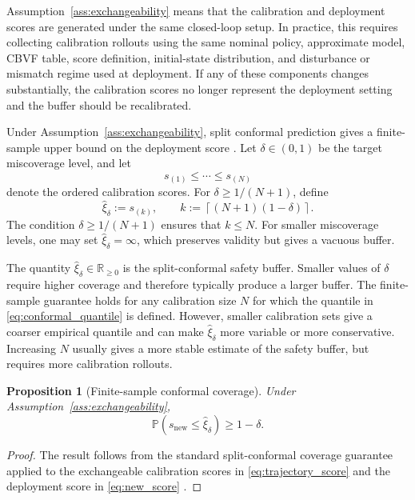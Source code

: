 \documentclass[letterpaper,10pt,conference]{ieeeconf}
\newtheorem{proposition}{Proposition}
\newcommand{\R}{\mathbb{R}}
\newcommand{\PP}{\mathbb{P}}
\begin{document}
Assumption~\ref{ass:exchangeability} means that the calibration and deployment
scores are generated under the same closed-loop setup. In practice, this
requires collecting calibration rollouts using the same nominal policy,
approximate model, CBVF table, score definition, initial-state distribution,
and disturbance or mismatch regime used at deployment. If any of these
components changes substantially, the calibration scores no longer represent
the deployment setting and the buffer should be recalibrated.

Under Assumption~\ref{ass:exchangeability}, split conformal prediction gives a
finite-sample upper bound on the deployment score
\cite{angelopoulos2023conformal,shafer2008tutorial}. Let $\delta\in(0,1)$ be
the target miscoverage level, and let
\[
    s_{(1)}\le \cdots \le s_{(N)}
\]
denote the ordered calibration scores. For $\delta\ge 1/(N+1)$, define
\begin{equation}
    \widehat\xi_{\delta}
    :=
    s_{(k)},
    \qquad
    k:=\left\lceil (N+1)(1-\delta)\right\rceil .
    \label{eq:conformal_quantile}
\end{equation}
The condition $\delta\ge 1/(N+1)$ ensures that $k\le N$. For smaller
miscoverage levels, one may set $\widehat\xi_{\delta}=\infty$, which preserves
validity but gives a vacuous buffer.

The quantity $\widehat\xi_{\delta}\in\R_{\ge 0}$ is the split-conformal safety
buffer. Smaller values of $\delta$ require higher coverage and therefore
typically produce a larger buffer. The finite-sample guarantee holds for any
calibration size $N$ for which the quantile in
\eqref{eq:conformal_quantile} is defined. However, smaller calibration sets
give a coarser empirical quantile and can make $\widehat\xi_{\delta}$ more
variable or more conservative. Increasing $N$ usually gives a more stable
estimate of the safety buffer, but requires more calibration rollouts.

\begin{proposition}[Finite-sample conformal coverage]
\label{prop:cp_coverage}
Under Assumption~\ref{ass:exchangeability},
\begin{equation}
    \PP\!\left(s_{\mathrm{new}}\le \widehat\xi_{\delta}\right)
    \ge 1-\delta .
    \label{eq:cp_coverage}
\end{equation}
\end{proposition}

\begin{proof}
The result follows from the standard split-conformal coverage guarantee applied
to the exchangeable calibration scores in \eqref{eq:trajectory_score} and the
deployment score in \eqref{eq:new_score}
\cite{angelopoulos2023conformal,shafer2008tutorial}.
\end{proof}
\end{document}
